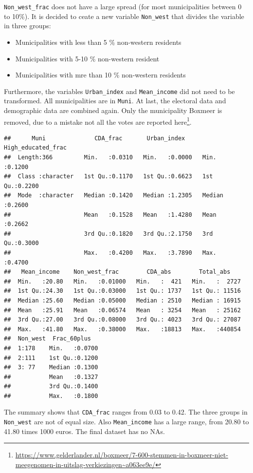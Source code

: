 \documentclass[11pt,]{article}
\let\rmarkdownfootnote\footnote%
\def\footnote{\protect\rmarkdownfootnote}
\begin{document}
\texttt{Non\_west\_frac} does not have a large spread (for most
municipalities between 0 to 10\%). It is decided to ceate a new variable
\texttt{Non\_west} that divides the variable in three groups:

\begin{itemize}
\item Municipalities with less than 5 \% non-western residents 
\item Municipalities with 5-10 \% non-western resident 
\item Municipalities with mre than 10 \% non-western residents
\end{itemize}

Furthermore, the variables \texttt{Urban\_index} and
\texttt{Mean\_income} did not need to be transformed. All municipalities
are in \texttt{Muni}. At last, the electoral data and demographic data
are combined again. Only the municipality Boxmeer is removed, due to a
mistake not all the votes are reported here\footnote{\url{https://www.gelderlander.nl/boxmeer/7-600-stemmen-in-boxmeer-niet-meegenomen-in-uitslag-verkiezingen~a063ee9e/}}.

\begin{verbatim}
##      Muni              CDA_frac       Urban_index     High_educated_frac
##  Length:366         Min.   :0.0310   Min.   :0.0000   Min.   :0.1200    
##  Class :character   1st Qu.:0.1170   1st Qu.:0.6623   1st Qu.:0.2200    
##  Mode  :character   Median :0.1420   Median :1.2305   Median :0.2600    
##                     Mean   :0.1528   Mean   :1.4280   Mean   :0.2662    
##                     3rd Qu.:0.1820   3rd Qu.:2.1750   3rd Qu.:0.3000    
##                     Max.   :0.4200   Max.   :3.7890   Max.   :0.4700    
##   Mean_income    Non_west_frac        CDA_abs        Total_abs     
##  Min.   :20.80   Min.   :0.01000   Min.   :  421   Min.   :  2727  
##  1st Qu.:24.30   1st Qu.:0.03000   1st Qu.: 1737   1st Qu.: 11516  
##  Median :25.60   Median :0.05000   Median : 2510   Median : 16915  
##  Mean   :25.91   Mean   :0.06574   Mean   : 3254   Mean   : 25162  
##  3rd Qu.:27.00   3rd Qu.:0.08000   3rd Qu.: 4023   3rd Qu.: 27087  
##  Max.   :41.80   Max.   :0.38000   Max.   :18813   Max.   :440854  
##  Non_west  Frac_60plus    
##  1:178    Min.   :0.0700  
##  2:111    1st Qu.:0.1200  
##  3: 77    Median :0.1300  
##           Mean   :0.1327  
##           3rd Qu.:0.1400  
##           Max.   :0.1800
\end{verbatim}

The summary shows that \texttt{CDA\_frac} ranges from 0.03 to 0.42. The
three groups in \texttt{Non\_west} are not of equal size. Also
\texttt{Mean\_income} has a large range, from 20.80 to 41.80 times 1000
euros. The final dataset has no NAs.
\end{document}

